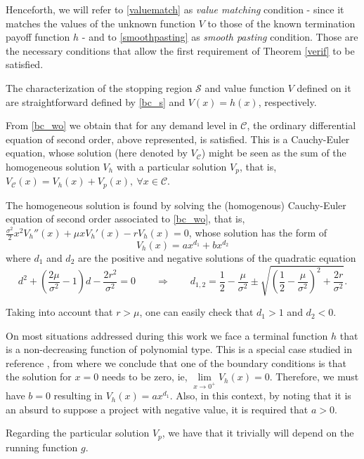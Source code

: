 Henceforth, we will refer to \eqref{valuematch} as \textit{value matching} condition - since it matches the values of the unknown function $V$ to those of the known termination payoff function $h$ - and to \eqref {smoothpasting} as \textit{smooth pasting} condition. Those are the necessary conditions that allow the first requirement of Theorem \ref{verif} to be satisfied.

The characterization of the stopping region $\mathcal{S}$ and value function $V$ defined on it are straightforward defined by \eqref{bc_s} and $V(x)=h(x)$, respectively.

From \eqref{bc_wo} we obtain that for any demand level in $\mathcal{C}$, the ordinary differential equation of second order, above represented, is satisfied. This is a Cauchy-Euler equation, whose solution (here denoted by $V_\mathcal{C}$) might be seen as the sum of the homogeneous solution $V_h$ with a particular solution $V_p$, that is, $V_\mathcal{C}(x)=V_h(x)+V_p(x), \ \forall x \in \mathcal{C}$.

The homogeneous solution is found by solving the (homogenous) Cauchy-Euler equation of second order associated to \eqref{bc_wo}, that is, $\frac{\sigma^2}{2}x^2 V_h''(x)+\mu x V_h'(x) - r V_h(x)=0$, whose solution has the form of
$$ V_h(x)=ax^{d_1}+bx^{d_2}$$
where $d_1$ and $d_2$ are the positive and negative solutions of the quadratic equation
\begin{equation}
d^2+\left( \frac{2 \mu}{\sigma^2}-1 \right)d-\frac{2r^2}{\sigma^2}=0 \qquad  \Rightarrow \qquad   d_{1,2}= \frac{1}{2}-\frac{\mu}{\sigma^2} \pm \sqrt{\left( \frac{1}{2} -\frac{\mu}{\sigma^2} \right) ^2+ \frac{2r}{\sigma^2}}.
\label{d1d2}
\end{equation}

Taking into account that $r>\mu$, one can easily check that $d_1>1$ and $d_2<0$.

On most situations addressed during this work we face a terminal function $h$ that is a non-decreasing function of polynomial type. This is a special case studied in reference \cite{guerra}, from where we conclude that one of the boundary conditions is that the solution for $x=0$ needs to be zero, ie, $\underset{x\to 0^+}{\lim} V_h(x)=0$. Therefore, we must have $b=0$ resulting in $V_h(x)=ax^{d_1}$.
Also, in this context, by noting that it is an absurd to suppose a project with negative value, it is required that $a>0$.


Regarding the particular solution $V_p$, we have that it trivially will depend on the running function $g$.

